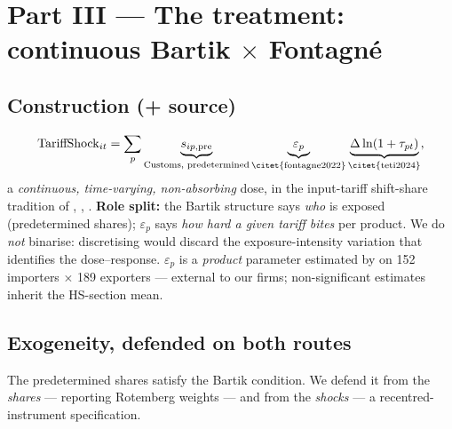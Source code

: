 \documentclass[11pt]{article}
\begin{document}
\section{Part III --- The treatment: continuous Bartik $\times$ Fontagn\'e}
\label{part:treat}

\subsection{Construction (+ source)}
\[
  \mathrm{TariffShock}_{it}
  =\sum_p \underbrace{s_{ip,\mathrm{pre}}}_{\text{Customs, predetermined}}
          \underbrace{\varepsilon_p}_{\text{\citet{fontagne2022}}}
          \underbrace{\Delta\ln(1+\tau_{pt})}_{\text{\citet{teti2024}}},
\]
a \emph{continuous, time-varying, non-absorbing} dose, in the input-tariff shift-share
tradition of \citet{amiti2007}, \citet{topalova2011}, \citet{tomasi2022}.
\textbf{Role split:} the Bartik structure says \emph{who} is exposed (predetermined
shares); $\varepsilon_p$ says \emph{how hard a given tariff bites} per product. We do
\emph{not} binarise: discretising would discard the exposure-intensity variation that
identifies the dose--response. $\varepsilon_p$ is a \emph{product} parameter estimated
by \citet{fontagne2022} on 152 importers $\times$ 189 exporters --- external to our
firms; non-significant estimates inherit the HS-section mean.

\subsection{Exogeneity, defended on both routes}
The predetermined shares satisfy the Bartik condition. We defend it from the
\emph{shares} \citep{goldsmithpinkham2020} --- reporting Rotemberg weights --- and from
the \emph{shocks} \citep{borusyakhull2022} --- a recentred-instrument specification.
\end{document}
